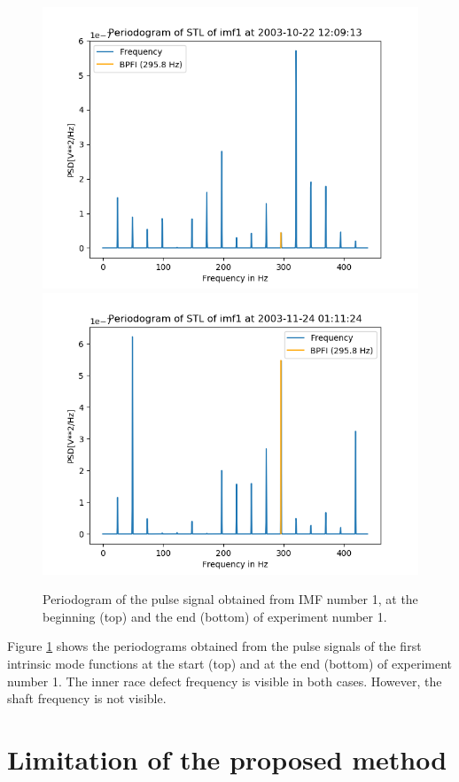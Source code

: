 \documentclass[../Main/thesis.tex]{subfiles}
\begin{document}
\begin{figure}[H]
	\centering
	\includegraphics[width=0.8\linewidth]{../fig/periodogram_bpfi/start_imf1_bpfi}
	\includegraphics[width=0.8\linewidth]{../fig/periodogram_bpfi/end_imf1_bpfi}
	\caption{Periodogram of the pulse signal obtained from IMF number 1, at the beginning (top) and the end (bottom) of experiment number 1.}
	\label{fig:startimf1bpfi}
\end{figure}
\justify
Figure \ref{fig:startimf1bpfi} shows the periodograms obtained from the pulse signals of the first intrinsic mode functions at the start (top) and at the end (bottom) of experiment number 1. The inner race defect frequency is visible in both cases.
However, the shaft frequency is not visible.
\section{Limitation of the proposed method}
\label{sec:limitation}






\blankpage
\end{document}
